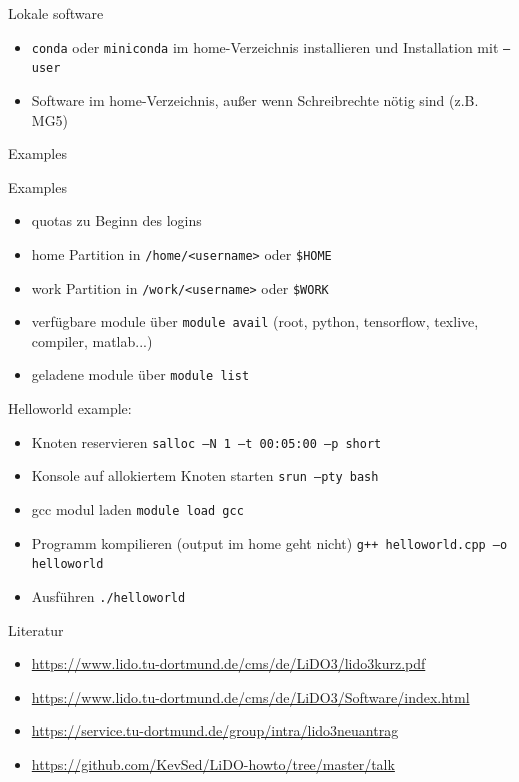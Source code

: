 \begin{frame}{Lokale software}
  \begin{itemize}
    \item \texttt{conda} oder \texttt{miniconda} im home-Verzeichnis installieren und Installation mit \texttt{--user}
    \item Software im home-Verzeichnis, außer wenn Schreibrechte nötig sind (z.B. MG5)
  \end{itemize}
\end{frame}

\begin{frame}
  \centering
  \Huge{Examples}
\end{frame}

\begin{frame}

\end{frame}

\begin{frame}{Examples}
  \begin{itemize}
    \item quotas zu Beginn des logins
    \item home Partition in \texttt{/home/<username>} oder \texttt{\$HOME}
    \item work Partition in \texttt{/work/<username>} oder \texttt{\$WORK}
    \item verfügbare module über \texttt{module avail} (root, python, tensorflow, texlive, compiler, matlab...)
    \item geladene module über \texttt{module list}
  \end{itemize}
  Helloworld example:
  \begin{itemize}
    \item Knoten reservieren \texttt{salloc –N 1 –t 00:05:00 –p short}
    \item Konsole auf allokiertem Knoten starten \texttt{srun --pty bash}
    \item gcc modul laden \texttt{module load gcc}
    \item Programm kompilieren (output im home geht nicht) \texttt{g++ helloworld.cpp  –o helloworld}
    \item Ausführen \texttt{./helloworld}
  \end{itemize}
\end{frame}

\begin{frame}{Literatur}
  \begin{itemize}
    \item \url{https://www.lido.tu-dortmund.de/cms/de/LiDO3/lido3kurz.pdf}
    \item \url{https://www.lido.tu-dortmund.de/cms/de/LiDO3/Software/index.html}
    \item \url{https://service.tu-dortmund.de/group/intra/lido3neuantrag}
    \item \url{https://github.com/KevSed/LiDO-howto/tree/master/talk}
  \end{itemize}
\end{frame}



